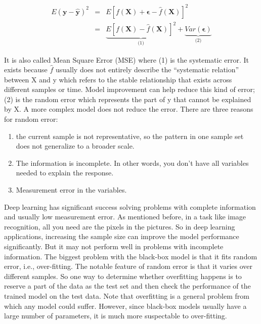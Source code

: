 \documentclass[12pt,]{krantz}
\providecommand{\tightlist}{%
  \setlength{\itemsep}{0pt}\setlength{\parskip}{0pt}}
\begin{document}
\begin{equation}
\begin{array}{ccc}
E(\mathbf{y}-\hat{\mathbf{y}})^{2} & = & E[f(\mathbf{X})+ \symbf{\epsilon} - \hat{f}(\mathbf{X})]^{2}\\
 & = & \underset{\text{(1)}}{\underbrace{E[f(\mathbf{X})-\hat{f}(\mathbf{X})]^{2}}}+\underset{\text{(2)}}{\underbrace{Var(\symbf{\epsilon})}}
\end{array}
\label{eq:error}
\end{equation}

It is also called Mean Square Error (MSE) where (1) is the systematic error. It exists because \(\hat{f}\) usually does not entirely describe the ``systematic relation'' between X and y which refers to the stable relationship that exists across different samples or time. Model improvement can help reduce this kind of error; (2) is the random error which represents the part of y that cannot be explained by X. A more complex model does not reduce the error. There are three reasons for random error:

\begin{enumerate}
\def\labelenumi{\arabic{enumi}.}
\tightlist
\item
  the current sample is not representative, so the pattern in one sample set does not generalize to a broader scale.
\item
  The information is incomplete. In other words, you don't have all variables needed to explain the response.
\item
  Measurement error in the variables.
\end{enumerate}

Deep learning has significant success solving problems with complete information and usually low measurement error. As mentioned before, in a task like image recognition, all you need are the pixels in the pictures. So in deep learning applications, increasing the sample size can improve the model performance significantly. But it may not perform well in problems with incomplete information. The biggest problem with the black-box model is that it fits random error, i.e., over-fitting. The notable feature of random error is that it varies over different samples. So one way to determine whether overfitting happens is to reserve a part of the data as the test set and then check the performance of the trained model on the test data. Note that overfitting is a general problem from which any model could suffer. However, since black-box models usually have a large number of parameters, it is much more suspectable to over-fitting.
\end{document}
